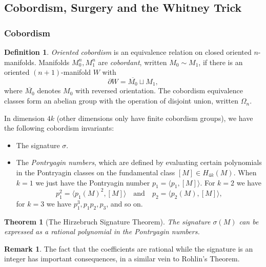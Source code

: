 \documentclass{article}
\newtheorem*{theorem}{Theorem}
\theoremstyle{definition}
\newtheorem*{definition}{Definition}
\newtheorem*{remark}{Remark}
\begin{document}
\subsection{Cobordism, Surgery and the Whitney Trick}

\subsubsection*{Cobordism}

\begin{definition}
    \emph{Oriented cobordism} is an equivalence relation on closed oriented
    $n$-manifolds. Manifolds $M_0^n,M_1^n$ are \emph{cobordant}, written
    $M_0\sim M_1$, if there is an oriented $(n+1)$-manifold $W$ with
    \begin{equation*}
        \partial W = \overline{M_0}\sqcup M_1, %
    \end{equation*}
    where $\overline{M_0}$ denotes $M_0$ with reversed orientation. The
    cobordism equivalence classes form an abelian group with the operation of
    disjoint union, written $\Omega_n$.
\end{definition}

In dimension $4k$ (other dimensions only have finite cobordism groups), we have
the following cobordism invariants:
\begin{itemize}
    \item The signature $\sigma$.
    \item The \emph{Pontryagin numbers}, which are defined by evaluating certain
        polynomials in the Pontryagin classes on the fundamental class
        $[M]\in H_{4k}(M)$. When $k=1$ we just have the Pontryagin number
        $p_1=\langle p_1,[M]\rangle$. For $k=2$ we have
        \begin{equation*}
            p_1^2 = \langle p_1(M)^2,[M]\rangle \quad \text{and} \quad
            p_2 = \langle p_2(M),[M]\rangle,
        \end{equation*}
        for $k=3$ we have $p_1^3,p_1p_2,p_3$, and so on.
\end{itemize}

\begin{theorem}[The Hirzebruch Signature Theorem]
    The signature $\sigma(M)$ can be expressed as a rational polynomial in the
    Pontryagin numbers.
\end{theorem}

\begin{remark}
    The fact that the coefficients are rational while the signature is an
    integer has important consequences, in a similar vein to Rohlin's Theorem.
\end{remark}
\end{document}
